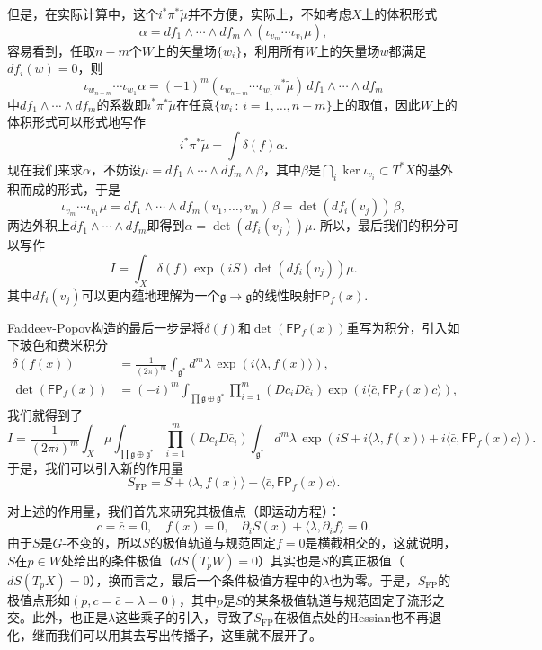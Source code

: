 \documentclass[11pt]{article}
\theoremstyle{definition}
\theoremstyle{plain}
\begin{document}
但是，在实际计算中，这个$i^*\pi^*\tilde \mu$并不方便，实际上，不如考虑$X$上的体积形式
\[
    \alpha=df_1\wedge \cdots \wedge df_m\wedge (\iota_{v_m}\cdots \iota_{v_1}\mu),
\]
容易看到，任取$n-m$个$W$上的矢量场$\{w_i\}$，利用所有$W$上的矢量场$w$都满足$df_i(w)=0$，则
\[
    \iota_{w_{n-m}}\cdots \iota_{w_1}\alpha=(-1)^{m}(\iota_{w_{n-m}}\cdots \iota_{w_1} \pi^*\tilde \mu)\, df_1\wedge \cdots \wedge df_m
\]
中$df_1\wedge \cdots \wedge df_m$的系数即$i^*\pi^*\tilde \mu$在任意$\{w_i\,:\,i=1,\dots,n-m\}$上的取值，因此$W$上的体积形式可以形式地写作
\[
    i^*\pi^*\tilde \mu=\int \delta(f)\alpha.
\]
现在我们来求$\alpha$，不妨设$\mu=df_1\wedge \cdots \wedge df_m\wedge\beta$，其中$\beta$是$\bigcap_i\ker \iota_{v_i}\subset T^*X$的基外积而成的形式，于是
\[
    \iota_{v_m}\cdots \iota_{v_1}\mu=df_1\wedge \cdots \wedge df_m(v_1,\dots,v_m)\,\beta=\det(df_i(v_j))\,\beta,
\]
两边外积上$df_1\wedge \cdots \wedge df_m$即得到$\alpha=\det(df_i(v_j))\mu$. 所以，最后我们的积分可以写作
\[
    I=\int_{X}\delta(f)\exp(iS)\det(df_i(v_j))\mu.
\]
其中$df_i(v_j)$可以更内蕴地理解为一个$\mathfrak g\to \mathfrak g$的线性映射$\mathsf{FP}_f(x)$.

Faddeev-Popov构造的最后一步是将$\delta(f)$和$\det(\mathsf{FP}_f(x))$重写为积分，引入如下玻色和费米积分
\begin{align*}
    \delta(f(x))&=\frac{1}{(2\pi)^m}\int_{\mathfrak{g}^*}d^m\lambda \,\exp(i\langle \lambda,f(x)\rangle),\\
    \det(\mathsf{FP}_f(x))&=(-i)^m\int_{\prod \mathfrak{g}\oplus \mathfrak{g}^*} \prod_{i=1}^m (Dc_iD\bar c_i) \exp\left(i\langle\bar c,\mathsf{FP}_f(x)c\rangle\right),
\end{align*}
我们就得到了
\[
    I=\frac{1}{(2\pi i)^m}\int_{X}\mu\int_{\prod \mathfrak{g}\oplus \mathfrak{g}^*} \prod_{i=1}^m (Dc_iD\bar c_i)\int_{\mathfrak{g}^*}d^m\lambda \,\exp(iS+i\langle \lambda,f(x)\rangle+i\langle\bar c,\mathsf{FP}_f(x)c\rangle).
\]
于是，我们可以引入新的作用量
\[
    S_{\text{FP}}=S+\langle \lambda,f(x)\rangle+\langle\bar c,\mathsf{FP}_f(x)c\rangle.
\]

对上述的作用量，我们首先来研究其极值点（即运动方程）：
\[
    c=\bar c=0,\quad f(x)=0,\quad \partial_i S(x)+\langle \lambda,\partial_i f\rangle=0.
\]
由于$S$是$G$-不变的，所以$S$的极值轨道与规范固定$f=0$是横截相交的，这就说明，$S$在$p\in W$处给出的条件极值（$dS(T_pW)=0$）其实也是$S$的真正极值（$dS(T_pX)=0$），换而言之，最后一个条件极值方程中的$\lambda$也为零。于是，$S_{\text{FP}}$的极值点形如$(p,c=\bar c=\lambda=0)$，其中$p$是$S$的某条极值轨道与规范固定子流形之交。此外，也正是$\lambda$这些乘子的引入，导致了$S_{\text{FP}}$在极值点处的Hessian也不再退化，继而我们可以用其去写出传播子，这里就不展开了。
\end{document}
